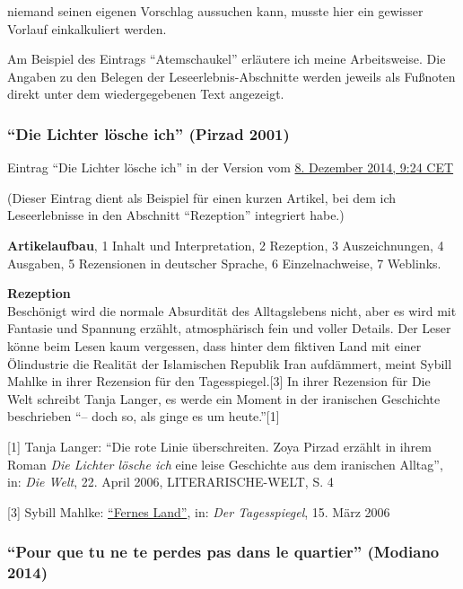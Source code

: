 \documentclass[fontsize=12pt]{scrartcl}
\begin{document}
niemand seinen eigenen Vorschlag aussuchen kann, musste \mbox{hier} ein gewisser Vorlauf einkalkuliert werden.

Am Beispiel des Eintrags "`Atemschaukel"' erl\"autere ich meine Arbeitsweise. Die Angaben zu den Belegen der Leseerlebnis-Abschnitte werden jeweils als Fu{\ss}noten direkt unter dem wiedergegebenen Text angezeigt.

\singlespacing
\subsubsection{"`Die Lichter l\"osche ich"' (Pirzad 2001)}
\label{subsubsec:6.1.1}

Eintrag "`Die Lichter l\"osche ich"' in der Version vom \href{https://de.wikipedia.org/w/index.php?title=Die_Lichter_l\%C3\%B6sche_ich\&oldid=136571720}{8. Dezember 2014, 9:24 CET}

(Dieser Eintrag dient als Beispiel f\"ur einen kurzen Artikel, bei dem ich Leseerlebnisse in den Abschnitt "`Rezeption"' integriert habe.)

\textbf{Artikelaufbau}, 1 Inhalt und Interpretation, 2 Rezeption, 3 Auszeichnungen, 4 Ausgaben, 5 Rezensionen in deutscher Sprache, 6 Einzelnachweise, 7 Weblinks.

\textbf{Rezeption}\\
Besch\"onigt wird die normale Absurdit\"at des All\-tagslebens nicht, aber es wird mit Fantasie und Spannung erz\"ahlt, atmosph\"arisch fein und voller Details. Der Leser k\"onne beim Lesen kaum vergessen, dass hinter dem fiktiven Land mit einer \"Ol\-industrie die Realit\"at der Islamischen Republik Iran aufd\"ammert, meint Sybill Mahl\-ke in ihrer Rezension f\"ur den Tagesspiegel.[3] In ihrer Rezension f\"ur Die Welt schreibt Tanja Langer, es werde ein Moment in der iranischen Geschichte beschrieben "`-- doch so, als ginge es um heute."'[1]

{\tiny[1] Tanja Langer: "`Die rote Linie \"uberschrei\-ten. Zoya Pirzad erz\"ahlt in ihrem Roman \textit{Die Lichter l\"osche ich} eine leise Geschichte aus dem iranischen All\-tag"', in: \textit{Die Welt}, 22. April 2006, LITERARISCHE-WELT, S. 4\par}
{\tiny[3] Sybill Mahlke: \href{http://www.tagesspiegel.de/kultur/fernes-land/693416.html}{"`Fernes Land"'}, in: \textit{Der Tagesspiegel}, 15. M\"arz 2006\par}

\subsubsection{"`Pour que tu ne te perdes pas dans le quartier"' (Modiano 2014)}
\label{subsubsec:6.1.2}
\end{document}
